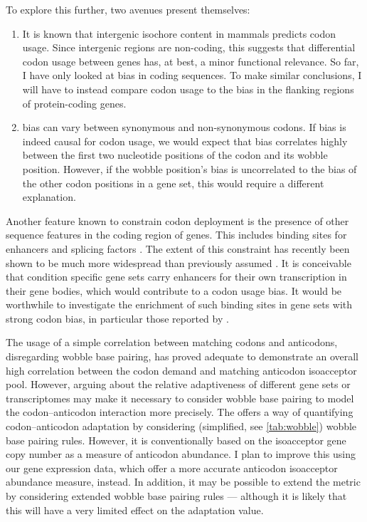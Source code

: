 To explore this further, two avenues present themselves:

\begin{enumerate}
    \item It is known that intergenic isochore \gc content in mammals predicts
        codon usage. Since intergenic regions are non-coding, this suggests that
        differential codon usage between genes has, at best, a minor functional
        relevance. So far, I have only looked at \gc bias in coding sequences.
        To make similar conclusions, I will have to instead compare codon usage
        to the \gc bias in the flanking regions of protein-coding genes.
    \item \gc bias can vary between synonymous and non-synonymous codons. If \gc
        bias is indeed causal for codon usage, we would expect that \gc bias
        correlates highly between the first two nucleotide positions of the
        codon and its wobble position. However, if the wobble position’s \gc
        bias is uncorrelated to the \gc bias of the other codon positions in a
        gene set, this would require a different explanation.
\end{enumerate}

Another feature known to constrain codon deployment is the presence of other
sequence features in the coding region of genes. This includes binding sites for
enhancers and splicing factors \citep{Hyder:1995,Blencowe:2000}. The extent of
this constraint has recently been shown to be much more widespread than
previously assumed \citep{Stergachis:2013}. It is conceivable that condition
specific gene sets carry enhancers for their own transcription in their gene
bodies, which would contribute to a codon usage bias. It would be worthwhile to
investigate the enrichment of such binding sites in gene sets with strong codon
bias, in particular those reported by \citep{Gingold:2014}.

The usage of a simple correlation between matching codons and anticodons,
disregarding wobble base pairing, has proved adequate to demonstrate an overall
high correlation between the codon demand and matching \trna anticodon
isoacceptor pool. However, arguing about the relative adaptiveness of different
gene sets or transcriptomes may make it  necessary to consider wobble base
pairing to model the codon--anticodon interaction more precisely. The \tai
\citep{Dos_Reis:2003} offers a way of quantifying codon--anticodon adaptation by
considering (simplified, see \cref{tab:wobble}) wobble base pairing rules.
However, it is conventionally based on the \trna isoacceptor gene copy number as
a measure of anticodon abundance. I plan to improve this using our \trna gene
expression data, which offer a more accurate anticodon isoacceptor abundance
measure, instead. In addition, it may be possible to extend the \tai metric by
considering extended wobble base pairing rules \citep{Murphy:2004} --- although
it is likely that this will have a very limited effect on the adaptation value.

